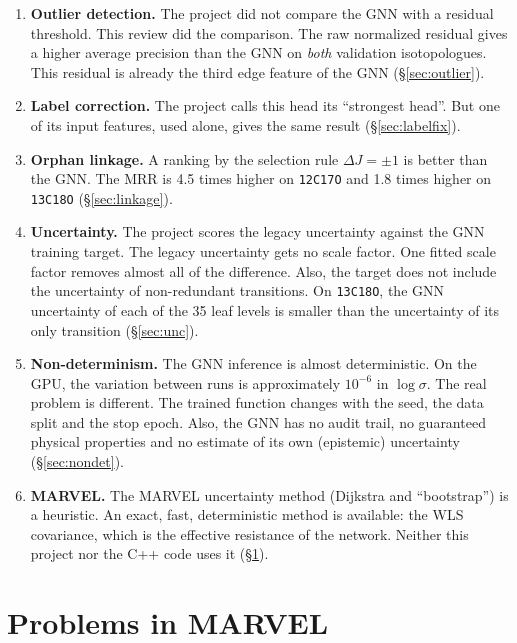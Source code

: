 \documentclass[11pt,a4paper]{article}
\newcommand{\code}[1]{\texttt{#1}}
\begin{document}
\begin{enumerate}
\item \textbf{Outlier detection.} The project did not compare the GNN with a residual
  threshold. This review did the comparison. The raw normalized residual gives a
  higher average precision than the GNN on \emph{both} validation isotopologues. This
  residual is already the third edge feature of the GNN (\S\ref{sec:outlier}).
\item \textbf{Label correction.} The project calls this head its ``strongest head''.
  But one of its input features, used alone, gives the same result
  (\S\ref{sec:labelfix}).
\item \textbf{Orphan linkage.} A ranking by the selection rule $\Delta J = \pm1$ is
  better than the GNN. The MRR is 4.5 times higher on \code{12C17O} and 1.8 times
  higher on \code{13C18O} (\S\ref{sec:linkage}).
\item \textbf{Uncertainty.} The project scores the legacy uncertainty against the
  GNN training target. The legacy uncertainty gets no scale factor. One fitted scale
  factor removes almost all of the difference. Also, the target does not include the
  uncertainty of non-redundant transitions. On \code{13C18O}, the GNN uncertainty of
  each of the 35 leaf levels is smaller than the uncertainty of its only transition
  (\S\ref{sec:unc}).
\item \textbf{Non-determinism.} The GNN inference is almost deterministic. On the GPU,
  the variation between runs is approximately $10^{-6}$ in $\log\sigma$. The real
  problem is different. The trained function changes with the seed, the data split and
  the stop epoch. Also, the GNN has no audit trail, no guaranteed physical properties
  and no estimate of its own (epistemic) uncertainty (\S\ref{sec:nondet}).
\item \textbf{MARVEL.} The MARVEL uncertainty method (Dijkstra and ``bootstrap'') is a
  heuristic. An exact, fast, deterministic method is available: the WLS covariance,
  which is the effective resistance of the network. Neither this project nor the C++
  code uses it (\S\ref{sec:marvel}).
\end{enumerate}

\section{Problems in MARVEL}\label{sec:marvel}
\end{document}
